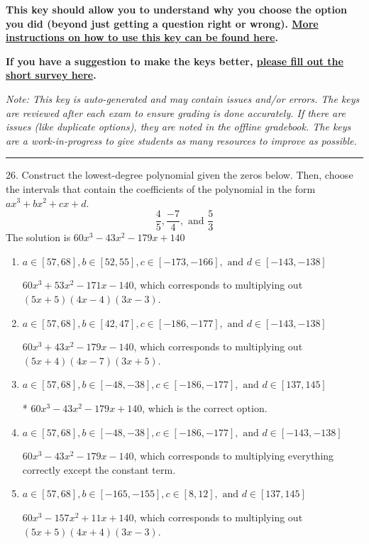 \documentclass{extbook}[14pt]
\begin{document}
\textbf{This key should allow you to understand why you choose the option you did (beyond just getting a question right or wrong). \href{https://xronos.clas.ufl.edu/mac1105spring2020/courseDescriptionAndMisc/Exams/LearningFromResults}{More instructions on how to use this key can be found here}.}

\textbf{If you have a suggestion to make the keys better, \href{https://forms.gle/CZkbZmPbC9XALEE88}{please fill out the short survey here}.}

\textit{Note: This key is auto-generated and may contain issues and/or errors. The keys are reviewed after each exam to ensure grading is done accurately. If there are issues (like duplicate options), they are noted in the offline gradebook. The keys are a work-in-progress to give students as many resources to improve as possible.}

\rule{\textwidth}{0.4pt}

26. Construct the lowest-degree polynomial given the zeros below. Then, choose the intervals that contain the coefficients of the polynomial in the form $ax^3+bx^2+cx+d$.
\[ \frac{4}{5}, \frac{-7}{4}, \text{ and } \frac{5}{3} \] 
The solution is $ 60x^{3} -43 x^{2} -179 x + 140 $ 

\begin{enumerate}[label=\Alph*.] 
\item $ a \in [57, 68], b \in [52, 55], c \in [-173, -166], \text{ and } d \in [-143, -138] $ 

 $60x^{3} +53 x^{2} -171 x -140$, which corresponds to multiplying out $(5x + 5)(4x -4)(3x -3)$. 
\item $ a \in [57, 68], b \in [42, 47], c \in [-186, -177], \text{ and } d \in [-143, -138] $ 

 $60x^{3} +43 x^{2} -179 x -140$, which corresponds to multiplying out $(5x + 4)(4x -7)(3x + 5)$. 
\item $ a \in [57, 68], b \in [-48, -38], c \in [-186, -177], \text{ and } d \in [137, 145] $ 

 * $60x^{3} -43 x^{2} -179 x + 140$, which is the correct option. 
\item $ a \in [57, 68], b \in [-48, -38], c \in [-186, -177], \text{ and } d \in [-143, -138] $ 

 $60x^{3} -43 x^{2} -179 x -140$, which corresponds to multiplying everything correctly except the constant term. 
\item $ a \in [57, 68], b \in [-165, -155], c \in [8, 12], \text{ and } d \in [137, 145] $ 

 $60x^{3} -157 x^{2} +11 x + 140$, which corresponds to multiplying out $(5x + 5)(4x + 4)(3x -3)$. 
\end{enumerate} 
 
\end{document}

